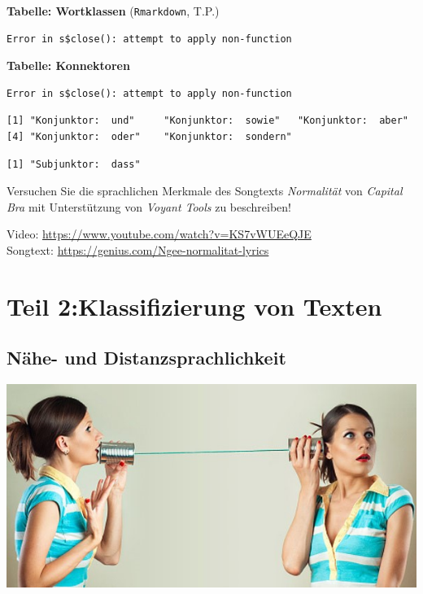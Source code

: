\documentclass[
  letterpaper,
]{scrbook}
\begin{document}
\textbf{Tabelle: Wortklassen} (\texttt{Rmarkdown}, T.P.)

\begin{verbatim}
Error in s$close(): attempt to apply non-function
\end{verbatim}

\textbf{Tabelle: Konnektoren}

\begin{verbatim}
Error in s$close(): attempt to apply non-function
\end{verbatim}

\begin{verbatim}
[1] "Konjunktor:  und"     "Konjunktor:  sowie"   "Konjunktor:  aber"   
[4] "Konjunktor:  oder"    "Konjunktor:  sondern"
\end{verbatim}

\begin{verbatim}
[1] "Subjunktor:  dass"
\end{verbatim}

Versuchen Sie die sprachlichen Merkmale des Songtexts \emph{Normalität}
von \emph{Capital Bra} mit Unterstützung von \emph{Voyant Tools} zu
beschreiben!

Video: \url{https://www.youtube.com/watch?v=KS7vWUEeQJE}\\
Songtext: \url{https://genius.com/Ngee-normalitat-lyrics}

\part{Teil 2:Klassifizierung von Texten}

\hypertarget{nuxe4he--und-distanzsprachlichkeit}{%
\chapter{Nähe- und
Distanzsprachlichkeit}\label{nuxe4he--und-distanzsprachlichkeit}}

\includegraphics[width=1\textwidth,height=\textheight]{./pictures/nahe_distanz_schnurtelefon.jpg}
\end{document}
